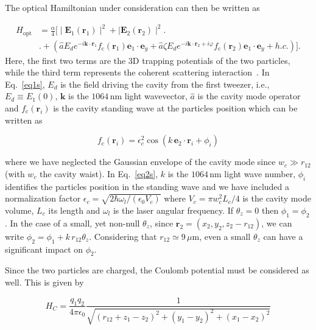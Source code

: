 \documentclass[aps,PRA,%
 amsmath,amssymb,
singlecolumn,
notitlepage,superscriptaddress,groupedaddress]{revtex4}
\newcommand{\di}{i}
\begin{document}
The optical Hamiltonian under consideration can then be written as

\begin{align}\label{eq1s} 
   H_{\text{opt}} & = \frac{\alpha}{4} \biggl[ \mid  \mathbf{E}_{1}(\mathbf{r}_1) \mid^2 + \mid \mathbf{E}_{2}(\mathbf{r}_2) \mid^2 \biggr. \nonumber\\
   &\biggl. + (\hat{a} E_d e^{-\di\mathbf{k}\cdot \mathbf{r}_1} f_{\text{c}} (\mathbf{r}_1) \mathbf{e}_1 \cdot \mathbf{e}_y  + \hat{a} \zeta E_d e^{-\di\mathbf{k}\cdot\mathbf{r}_2+\di\varphi} f_{\text{c}} (\mathbf{r}_2) \mathbf{e}_1 \cdot \mathbf{e}_y + h.c. )   \biggr].
\end{align}
Here, the first two terms are the 3D trapping potentials of the two particles, while the third term represents the coherent scattering interaction~\cite{Vuletic2000Laser,toros2021Coherent}. In Eq.~\ref{eq1s}, $E_d$ is the field driving the cavity from the first tweezer, i.e., $E_d\equiv E_1(0)$, $\mathbf{k}$ is the $1064$\,nm light wavevector, $\hat{a}$ is the cavity mode operator and $f_{\text{c}}(\mathbf{r}_i)$ is the cavity standing wave at the particles position which can be written as

\begin{equation}\label{eq2s}
    f_{\text{c}}(\mathbf{r}_i)=\epsilon_c^2 \cos(k\,\mathbf{e}_2\cdot \mathbf{r}_i+\phi_i)
\end{equation}

\noindent where we have neglected the Gaussian envelope of the cavity mode since $w_c\gg r_{12}$ (with $w_c$ the cavity waist). In Eq.~\ref{eq2s}, $k$ is the $1064$\,nm light wave number, $\phi_i$ identifies the particles position in the standing wave and we have included a normalization factor $\epsilon_c=\sqrt{2\hbar \omega_l/(\epsilon_0 V_c)}$ where $V_c=\pi w_c^2 L_c/4$ is the cavity mode volume, $L_c$ its length and $\omega_l$ is the laser angular frequency. If $\theta_z=0$ then $\phi_1=\phi_2$. In the case of a small, yet non-null $\theta_z$, since $\mathbf{r}_2=(x_2,y_2,z_2-r_{12})$, we can write  $\phi_2=\phi_1+k\,r_{12}\theta_z$. Considering that $r_{12}\simeq9\,\mu$m, even a small $\theta_z$ can have a significant impact on $\phi_2$.

Since the two particles are charged, the Coulomb potential must be considered as well. This is given by

\begin{equation}
    H_C=\frac{q_1 q_2}{4\pi\epsilon_0}\frac{1}{\sqrt{(r_{12}+z_1-z_2)^2+(y_1-y_2)^2+(x_1-x_2)^2}}
\end{equation}
\end{document}
